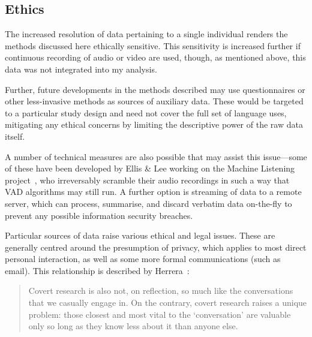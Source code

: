 \subsection{Ethics}
\label{sec:personal:discussion:ethics}


The increased resolution of data pertaining to a single individual renders the methods discussed here ethically sensitive.  This sensitivity is increased further if continuous recording of audio or video are used, though, as mentioned above, this data was not integrated into my analysis.


Further, future developments in the methods described may use questionnaires or other less-invasive methods as sources of auxiliary data.  These would be targeted to a particular study design and need not cover the full set of language uses, mitigating any ethical concerns by limiting the descriptive power of the raw data itself.

A number of technical measures are also possible that may assist this issue---some of these have been developed by Ellis \& Lee working on the Machine Listening project~\cite{ellis2004audiolog}, who irreversably scramble their audio recordings in such a way that VAD algorithms may still run.  A further option is streaming of data to a remote server, which can process, summarise, and discard verbatim data on-the-fly to prevent any possible information security breaches.


Particular sources of data raise various ethical and legal issues. These are generally centred around the presumption of privacy, which applies to most direct personal interaction, as well as some more formal communications (such as email).  This relationship is described by Herrera~\cite{herrera1999covert}:

\begin{quote}
Covert research is also not, on reflection, so much like the conversations that we casually engage in. On the contrary, covert research raises a unique problem: those closest and most vital to the ‘conversation’ are valuable only so long as they know less about it than anyone else.
\end{quote}

